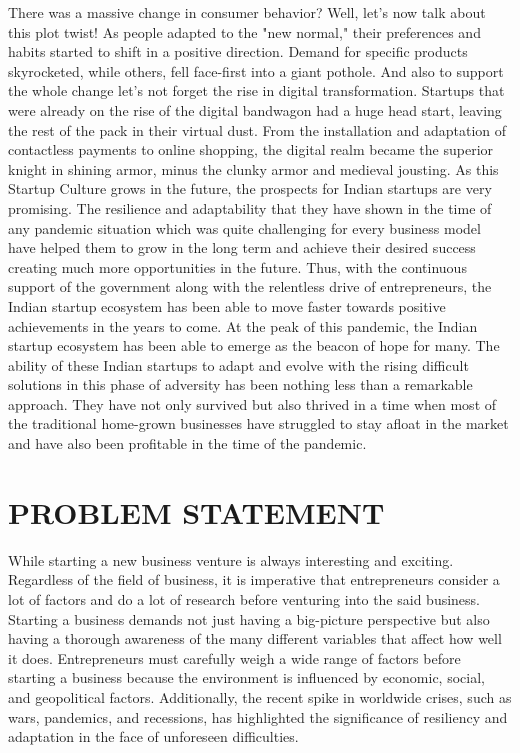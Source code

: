 \documentclass[12pt]{article}
\begin{document}
There was a massive change in consumer behavior? Well, let's now talk about this plot twist! As people adapted to the "new normal," their preferences and habits started to shift in a positive direction. Demand for specific products skyrocketed, while others, fell face-first into a giant pothole. And also to support the whole change let's not forget the rise in digital transformation. Startups that were already on the rise of the digital bandwagon had a huge head start, leaving the rest of the pack in their virtual dust. From the installation and adaptation of contactless payments to online shopping, the digital realm became the superior knight in shining armor, minus the clunky armor and medieval jousting. As this Startup Culture grows in the future, the prospects for Indian startups are very promising. The resilience and adaptability that they have shown in the time of any pandemic situation which was quite challenging for every business model have helped them to grow in the long term and achieve their desired success creating much more opportunities in the future. Thus, with the continuous support of the government along with the relentless drive of entrepreneurs, the Indian startup ecosystem has been able to move faster towards positive achievements in the years to come. At the peak of this pandemic, the Indian startup ecosystem has been able to emerge as the beacon of hope for many. The ability of these Indian startups to adapt and evolve with the rising difficult solutions in this phase of adversity has been nothing less than a remarkable approach. They have not only survived but also thrived in a time when most of the traditional home-grown businesses have struggled to stay afloat in the market and have also been profitable in the time of the pandemic.

\newpage
\section{PROBLEM STATEMENT}
While starting a new business venture is always interesting and exciting. Regardless of the field of business, it is imperative that entrepreneurs consider a lot of factors and do a lot of research before venturing into the said business. Starting a business demands not just having a big-picture perspective but also having a thorough awareness of the many different variables that affect how well it does. Entrepreneurs must carefully weigh a wide range of factors before starting a business because the environment is influenced by economic, social, and geopolitical factors. Additionally, the recent spike in worldwide crises, such as wars, pandemics, and recessions, has highlighted the significance of resiliency and adaptation in the face of unforeseen difficulties.
\end{document}
